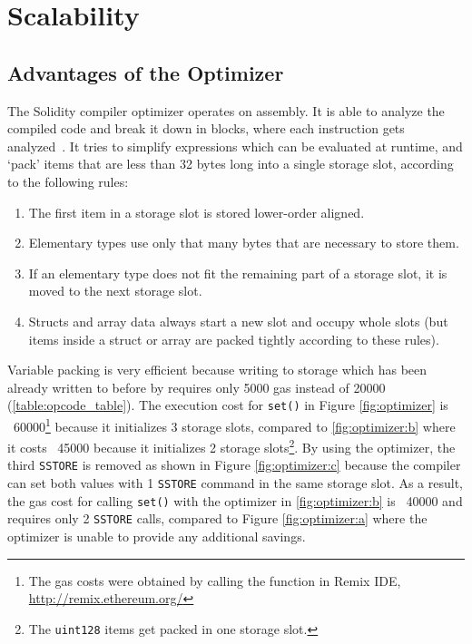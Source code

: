 \chapter{Scalability} \label{apx:scalability}

\section{Advantages of the Optimizer}

The Solidity compiler optimizer operates on assembly. It is able to analyze the compiled code and break it down in blocks, where each instruction gets analyzed~\cite{docsmisc}. It tries to simplify expressions which can be evaluated at runtime, and `pack' items that are less than 32 bytes long into a single storage slot, according to the following rules:

\begin{enumerate}
  \item The first item in a storage slot is stored lower-order aligned.
  \item Elementary types use only that many bytes that are necessary to store them.
  \item If an elementary type does not fit the remaining part of a storage slot, it is moved to the next storage slot.
  \item Structs and array data always start a new slot and occupy whole slots (but items inside a struct or array are packed tightly according to these rules).
\end{enumerate}

Variable packing is very efficient because writing to storage which has been already written to before by  requires only 5000 gas instead of 20000 (\ref{table:opcode_table}). The execution cost for \texttt{set()} in Figure \ref{fig:optimizer} is ~60000\footnote{The gas costs were obtained by calling the function in Remix IDE, \url{http://remix.ethereum.org/}} because it initializes 3 storage slots, compared to \ref{fig:optimizer:b} where it costs ~45000 because it initializes 2 storage slots\footnote{The \texttt{uint128} items get packed in one storage slot.}. By using the optimizer, the third \texttt{SSTORE} is removed as shown in Figure \ref{fig:optimizer:c} because the compiler can set both values with 1 \texttt{SSTORE} command in the same storage slot. As a result, the gas cost for calling \texttt{set()} with the optimizer in \ref{fig:optimizer:b} is ~40000 and requires only 2 \texttt{SSTORE} calls, compared to Figure \ref{fig:optimizer:a} where the optimizer is unable to provide any additional savings.

